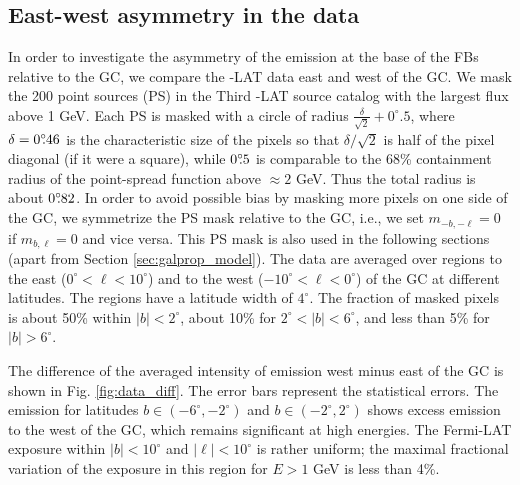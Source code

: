 \subsection{East-west  asymmetry in the data}
\label{sec:data_diff}

In order to investigate the asymmetry of the emission at the base of the FBs relative to the GC, 
we compare the \Fermi-LAT data east and west of the GC. 
We mask the 200 point sources (PS) in the Third \Fermi-LAT source catalog \citep[3FGL,][]{2015ApJS..218...23A}
with the largest flux above 1 GeV.
Each PS is masked with a circle of radius $\frac{\delta}{\sqrt{2}} + 0^\circ\!\!.5$, where $\delta = 0^\circ\!\!.46$ is the characteristic size of the pixels
so that ${\delta}/{\sqrt{2}}$ is half of the pixel diagonal (if it were a square), while $0^\circ\!\!.5$ is comparable to 
the 68\% containment radius of the point-spread function above $\approx 2$ GeV.
Thus the total radius is about $0^\circ\!\!.82$.
In order to avoid possible bias by masking more pixels on one side of the GC,
we symmetrize the PS mask relative to the GC, i.e., we set $m_{-b, -\ell} = 0$ if $m_{b, \ell} = 0$ and vice versa.
This PS mask is also used in the following sections (apart from Section \ref{sec:galprop_model}).
The data are averaged over regions to the east ($0^\circ < \ell < 10^\circ$) and to the west ($-10^\circ < \ell  <  0^\circ$) 
of the GC at different latitudes. 
The regions have a latitude width of $4^\circ$. 
The fraction of masked pixels is about 50\% within $|b| < 2^\circ$, about 10\% for $2^\circ < |b| < 6^\circ$, and less than  5\% 
for $|b| > 6^\circ$.

The difference of the averaged intensity of emission west minus east of the GC is shown in Fig. \ref{fig:data_diff}. 
The error bars represent the statistical errors.
The emission for latitudes $b \in (-6^\circ, -2^\circ)$ and $b \in (-2^\circ, 2^\circ)$ shows excess emission to the west of the GC, 
which remains significant at high energies. 
The Fermi-LAT exposure within $|b| < 10^\circ$ and $|\ell| < 10^\circ$ is rather uniform; 
the maximal fractional variation of the exposure in this region for $E > 1$ GeV is less than 4\%.

